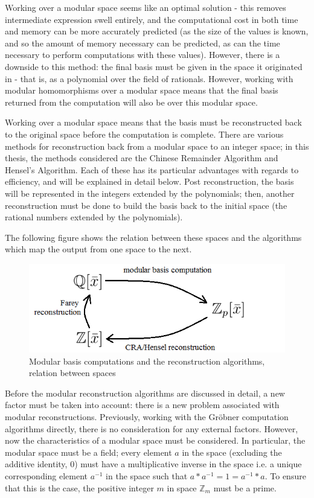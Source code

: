 \documentclass[letterpaper,12pt,titlepage,oneside,final]{book}
\begin{document}
Working over a modular space seems like an optimal solution - this removes intermediate expression swell entirely, and the computational cost in both time and memory can be more accurately predicted (as the size of the values is known, and so the amount of memory necessary can be predicted, as can the time necessary to perform computations with these values).  However, there is a downside to this method: the final basis must be given in the space it originated in - that is, as a polynomial over the field of rationals.  However, working with modular homomorphisms over a modular space means that the final basis returned from the computation will also be over this modular space.  

Working over a modular space means that the basis must be reconstructed back to the original space before the computation is complete.  There are various methods for reconstruction back from a modular space to an integer space; in this thesis, the methods considered are the Chinese Remainder Algorithm and Hensel's Algorithm.  Each of these has its particular advantages with regards to efficiency, and will be explained in detail below.  Post reconstruction, the basis will be represented in the integers extended by the polynomials; then, another reconstruction must be done to build the basis back to the initial space (the rational numbers extended by the polynomials).    

The following figure shows the relation between these spaces and the algorithms which map the output from one space to the next.

\begin{figure}[H]
  \centering
  \includegraphics[scale=0.5]{reconstructionRelations.png}
  \caption{Modular basis computations and the reconstruction algorithms, relation between spaces \label{fig:bb_tests}}
\end{figure}

Before the modular reconstruction algorithms are discussed in detail, a new factor must be taken into account: there is a new problem associated with modular reconstructions.  Previously, working with the Gr\"obner computation algorithms directly, there is no consideration for any external factors.  However, now the characteristics of a modular space must be considered.  In particular, the modular space must be a field; every element ${a}$ in the space (excluding the additive identity, 0) must have a multiplicative inverse in the space i.e. a unique corresponding element ${a^{-1}}$ in the space such that ${a*a^{-1} = 1 = a^{-1}*a}$.  To ensure that this is the case, the positive integer ${m}$ in space ${\mathbb{Z}_m}$ must be a prime.
\end{document}
